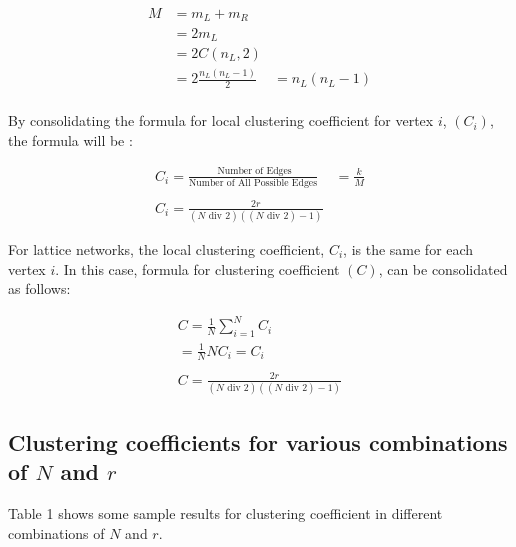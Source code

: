 \documentclass[11pt,a4,twocolumn]{article}
\theoremstyle{plain}
\theoremstyle{definition}
\theoremstyle{remark}
\begin{document}
\begin{align*}
M 	& = m_L + m_R \\
	& = 2 m_L \\
	& = 2 C ( n_L, 2) \\
	& = 2 \frac{n_L (n_L - 1)}{2}
	& = n_L (n_L - 1) \\
\end{align*}

\par 
\noindent By consolidating the formula for local clustering coefficient for vertex $i$, $(C_i)$, the formula will be : 

\begin{align*}
C_i 		 = \frac{\text{ Number of Edges} }{\text{Number of All Possible Edges} } 
		& = \frac{k}{M} \\
\\
C_i 		  = \frac{2r}{(N \text{ div  } 2) ( (N \text{ div  } 2) - 1)}
\end{align*}

\par 
\noindent For lattice networks, the local clustering coefficient, $C_i$, is the same for each vertex $i$. In this case, formula for clustering coefficient $(C)$, can be consolidated as follows:

\begin{align*}
C 		= \frac{1}{N} \sum_{i=1}^N C_i \\
		= \frac{1}{N} N C_i 
	 	= C_i \\
\\
C		  = \frac{2r}{(N \text{ div  } 2) ( (N \text{ div  } 2) - 1)}
\end{align*}


\subsection{Clustering coefficients for various combinations of $N$ and $r$}

Table 1 shows some sample results for clustering coefficient in different combinations of $N$ and $r$. 
\end{document}
